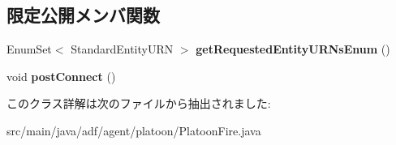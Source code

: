 \subsection*{限定公開メンバ関数}
\begin{DoxyCompactItemize}
\item 
\hypertarget{classadf_1_1agent_1_1platoon_1_1PlatoonFire_a4ced1ed81d2af29b147f621b8da66df9}{}\label{classadf_1_1agent_1_1platoon_1_1PlatoonFire_a4ced1ed81d2af29b147f621b8da66df9} 
Enum\+Set$<$ Standard\+Entity\+U\+RN $>$ {\bfseries get\+Requested\+Entity\+U\+R\+Ns\+Enum} ()
\item 
\hypertarget{classadf_1_1agent_1_1platoon_1_1PlatoonFire_a9cae59f50fcee0b5e41d20095d1a062a}{}\label{classadf_1_1agent_1_1platoon_1_1PlatoonFire_a9cae59f50fcee0b5e41d20095d1a062a} 
void {\bfseries post\+Connect} ()
\end{DoxyCompactItemize}


このクラス詳解は次のファイルから抽出されました\+:\begin{DoxyCompactItemize}
\item 
src/main/java/adf/agent/platoon/Platoon\+Fire.\+java\end{DoxyCompactItemize}
